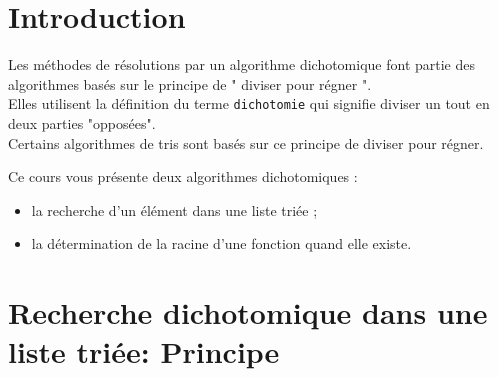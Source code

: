 \def\xxactivite{Cours}

\def\xxauteur{Xavier Pessoles}
\fichefalse \proftrue \tdfalse \courstrue

\def\xxnumchapitre{Chapitre 5 \vspace{.2cm}}
\def\xxchapitre{\hspace{.12cm} Dichotomie}

\def\xxcompetences{%
\textsl{%
\textbf{Savoirs et compétences :}\\
\begin{itemize}[label=\ding{112},font=\color{bleuxp}] 
\item Algorithmes dichotomiques.
\end{itemize}
}}

\def\xxfigures{
}%


\setlength{\columnseprule}{.1pt}

\vspace{2cm}
\pagestyle{fancy}
\thispagestyle{plain}



\section{Introduction}
Les méthodes de résolutions par un algorithme dichotomique font partie des algorithmes basés sur le principe de " diviser pour régner ".\\
Elles utilisent la définition du terme \texttt{dichotomie} qui signifie diviser un tout en deux parties "opposées".\\
Certains algorithmes de tris sont basés sur ce principe de diviser pour régner.



Ce cours vous présente deux algorithmes dichotomiques :
\begin{itemize}
\item la recherche d'un élément dans une liste triée ;
\item la détermination de la racine d'une fonction quand elle existe.
\end{itemize}

\section{Recherche dichotomique dans une liste     {triée}: Principe}

